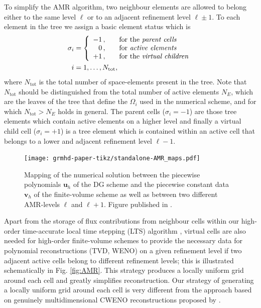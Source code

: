 To simplify the AMR algorithm, two neighbour elements are allowed to
belong either to the same level $\ell$ or to an adjacent refinement level
$\ell \pm 1$. To each element in the tree we assign a basic {element
  status} which is
%
\begin{align}
\sigma_i &= \left\{\begin{array}{rcl} 
-1\,, & & \text{for the  \emph{parent cells}} \\
\phantom{-}0\,, & & \text{for \emph{active elements}} \\
+1\,, & & \text{for the  \emph{virtual children}}
\end{array}\right. \nonumber \\
 i&=1,\ldots, N_{\text{tot}},
\end{align}
%
where $N_{\text{tot}}$ is the total number of space-elements present in
the tree. Note that $N_{\text{tot}}$ should be distinguished from the
total number of {active} elements $N_E$, which are the leaves of the tree
that define the $\Omega_i$ used in the numerical scheme, and for which
$N_{\text{tot}}>N_E$ holds in general. The  {parent cells}
($\sigma_i=-1$) are those tree elements which contain active elements on
a higher level and finally a {virtual child cell} ($\sigma_i=+1$) is a
tree element which is {contained} within an active cell that belongs to a
{lower} and {adjacent} refinement level $\ell-1$.

\begin{figure}[t]
\texttt{[image: grmhd-paper-tikz/standalone-AMR\_maps.pdf]}
\caption[
   Restriction and projection with AMR, drawin ,
 ]{Mapping of the numerical solution between the piecewise
  polynomials $\boldsymbol{u}_h$ of the DG scheme and the piecewise constant data
  $\boldsymbol{v}_h$ of the finite-volume scheme as well as between two different
  AMR-levels $\ell$ and $\ell+1$. Figure published in \cite{Fambri2017}.}
\label{fig:AMRmaps}
\end{figure}

Apart from the storage of flux contributions from neighbour cells within
our high-order time-accurate local time stepping (LTS) algorithm
\cite{AMR3DCL}, virtual cells are also needed for high-order
finite-volume schemes to provide the necessary data for polynomial
reconstructions (TVD, WENO) on a given refinement level if two adjacent
active cells belong to {different} refinement levels; this is illustrated
schematically in Fig. \ref{fig:AMR}. This strategy produces a locally
uniform grid around each cell and greatly simplifies reconstruction. Our
strategy of generating a locally uniform grid around each cell is very
different from the approach based on genuinely multidimensional CWENO
reconstructions proposed by \cite{SCR:CWENOquadtree}.

